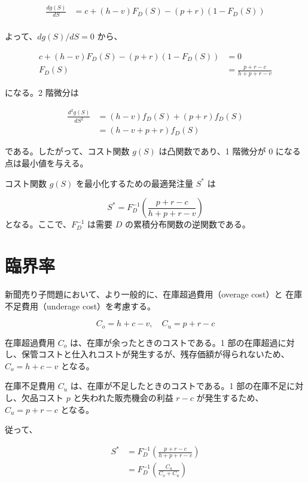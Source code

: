 \documentclass[
  japanese,
  letterpaper,
]{ltjbook}
\theoremstyle{plain}
\theoremstyle{definition}
\theoremstyle{remark}
\begin{document}
\begin{align}
\frac{dg(S)}{dS} &= c + (h - v) F_D(S) - (p + r) (1 - F_D(S)) \\
\end{align}

よって、\(dg(S)/dS = 0\) から、

\begin{align}
c + (h - v) F_D(S) - (p + r) (1 - F_D(S)) &= 0 \\
F_D(S) &= \frac{p + r - c}{h + p + r - v}
\end{align}

になる。2 階微分は

\begin{align}
\frac{d^2g(S)}{dS^2} &= (h - v) f_D(S) + (p + r) f_D(S) \\
&= (h - v + p + r) f_D(S) 
\end{align}

である。したがって、コスト関数 \(g(S)\) は凸関数であり、1 階微分が 0
になる点は最小値を与える。

コスト関数 \(g(S)\) を最小化するための最適発注量 \(S^*\) は

\[
S^* = F_D^{-1}\left(\frac{p + r - c}{h + p + r - v}\right)
\] となる。ここで、\(F_D^{-1}\) は需要 \(D\)
の累積分布関数の逆関数である。

\section{臨界率}\label{ux81e8ux754cux7387}

新聞売り子問題において、より一般的に、在庫超過費用（overage cost）と
在庫不足費用（underage cost）を考慮する。

\[
C_o = h + c - v, \quad C_u = p + r - c
\]

在庫超過費用 \(C_o\) は、在庫が余ったときのコストである。1
部の在庫超過に対し、保管コストと仕入れコストが発生するが、残存価額が得られないため、\(C_o = h + c - v\)
となる。

在庫不足費用 \(C_u\) は、在庫が不足したときのコストである。1
部の在庫不足に対し、欠品コスト \(p\) と失われた販売機会の利益 \(r - c\)
が発生するため、\(C_u = p + r - c\) となる。

従って、

\begin{align*}
S^* &= F_D^{-1}\left(\frac{p + r - c}{h + p + r - v}\right)\\
&= F_D^{-1}\left(\frac{C_u}{C_o + C_u}\right)
\end{align*}
\end{document}

